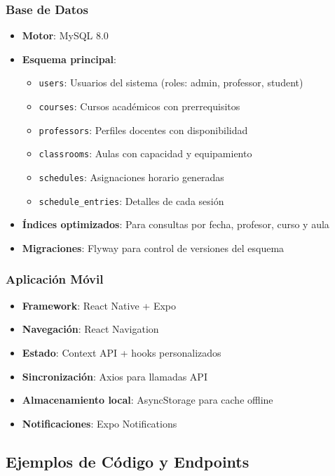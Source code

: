 \subsubsection{Base de Datos}
\begin{itemize}
\item \textbf{Motor}: MySQL 8.0
\item \textbf{Esquema principal}:
  \begin{itemize}
  \item \texttt{users}: Usuarios del sistema (roles: admin, professor, student)
  \item \texttt{courses}: Cursos académicos con prerrequisitos
  \item \texttt{professors}: Perfiles docentes con disponibilidad
  \item \texttt{classrooms}: Aulas con capacidad y equipamiento
  \item \texttt{schedules}: Asignaciones horario generadas
  \item \texttt{schedule\_entries}: Detalles de cada sesión
  \end{itemize}
\item \textbf{Índices optimizados}: Para consultas por fecha, profesor, curso y aula
\item \textbf{Migraciones}: Flyway para control de versiones del esquema
\end{itemize}

\subsubsection{Aplicación Móvil}
\begin{itemize}
\item \textbf{Framework}: React Native + Expo
\item \textbf{Navegación}: React Navigation
\item \textbf{Estado}: Context API + hooks personalizados
\item \textbf{Sincronización}: Axios para llamadas API
\item \textbf{Almacenamiento local}: AsyncStorage para cache offline
\item \textbf{Notificaciones}: Expo Notifications
\end{itemize}

\subsection{Ejemplos de Código y Endpoints}

